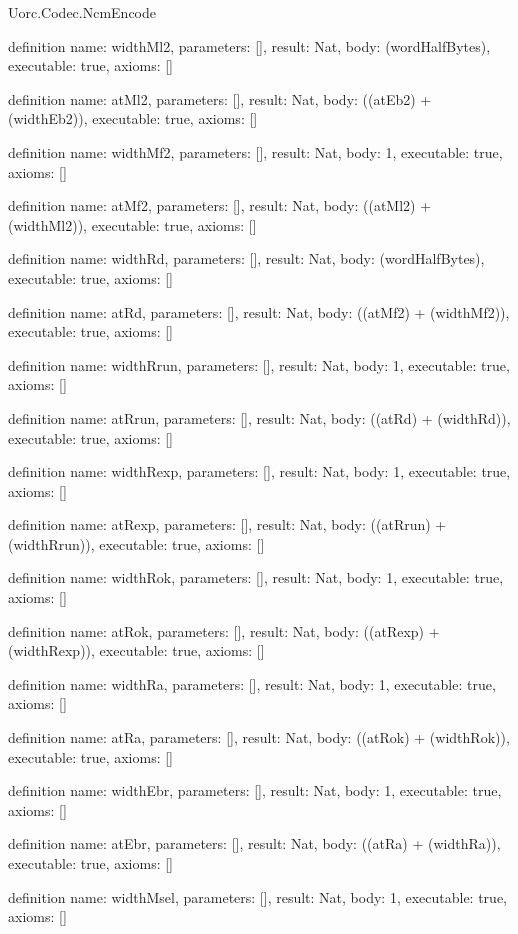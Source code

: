 \begin{lexlean}{Uorc.Codec.NcmEncode}
\begin{semanticmodule}
definition{
  name: widthMl2,
  parameters: [],
  result: Nat,
  body: (wordHalfBytes),
  executable: true,
  axioms: []
}

definition{
  name: atMl2,
  parameters: [],
  result: Nat,
  body: ((atEb2) + (widthEb2)),
  executable: true,
  axioms: []
}

definition{
  name: widthMf2,
  parameters: [],
  result: Nat,
  body: 1,
  executable: true,
  axioms: []
}

definition{
  name: atMf2,
  parameters: [],
  result: Nat,
  body: ((atMl2) + (widthMl2)),
  executable: true,
  axioms: []
}

definition{
  name: widthRd,
  parameters: [],
  result: Nat,
  body: (wordHalfBytes),
  executable: true,
  axioms: []
}

definition{
  name: atRd,
  parameters: [],
  result: Nat,
  body: ((atMf2) + (widthMf2)),
  executable: true,
  axioms: []
}

definition{
  name: widthRrun,
  parameters: [],
  result: Nat,
  body: 1,
  executable: true,
  axioms: []
}

definition{
  name: atRrun,
  parameters: [],
  result: Nat,
  body: ((atRd) + (widthRd)),
  executable: true,
  axioms: []
}

definition{
  name: widthRexp,
  parameters: [],
  result: Nat,
  body: 1,
  executable: true,
  axioms: []
}

definition{
  name: atRexp,
  parameters: [],
  result: Nat,
  body: ((atRrun) + (widthRrun)),
  executable: true,
  axioms: []
}

definition{
  name: widthRok,
  parameters: [],
  result: Nat,
  body: 1,
  executable: true,
  axioms: []
}

definition{
  name: atRok,
  parameters: [],
  result: Nat,
  body: ((atRexp) + (widthRexp)),
  executable: true,
  axioms: []
}

definition{
  name: widthRa,
  parameters: [],
  result: Nat,
  body: 1,
  executable: true,
  axioms: []
}

definition{
  name: atRa,
  parameters: [],
  result: Nat,
  body: ((atRok) + (widthRok)),
  executable: true,
  axioms: []
}

definition{
  name: widthEbr,
  parameters: [],
  result: Nat,
  body: 1,
  executable: true,
  axioms: []
}

definition{
  name: atEbr,
  parameters: [],
  result: Nat,
  body: ((atRa) + (widthRa)),
  executable: true,
  axioms: []
}

definition{
  name: widthMsel,
  parameters: [],
  result: Nat,
  body: 1,
  executable: true,
  axioms: []
}


\end{semanticmodule}
\end{lexlean}
